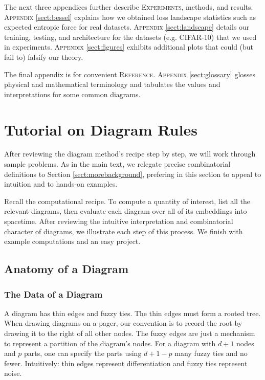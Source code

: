 \documentclass{article}
\theoremstyle{plain}
\theoremstyle{definition}
\begin{document}
    The next three appendices further describe \textsc{Experiments}, methods,
    and results.
    \textsc{Appendix} \ref{sect:bessel} explains how we obtained loss landscape
        statistics such as expected entropic force for real datasets.
    \textsc{Appendix} \ref{sect:landscape} details our training, testing, and
        architecture for the datasets (e.g. CIFAR-10) that we used in
        experiments.
    \textsc{Appendix} \ref{sect:figures} exhibits additional plots that could
        (but fail to) falsify our theory.

    The final appendix is for convenient \textsc{Reference}.
    \textsc{Appendix} \ref{sect:glossary} glosses physical and mathematical
        terminology and tabulates the values and interpretations for some
        common diagrams.

\section{Tutorial on Diagram Rules} \label{sect:tutorial}

    After reviewing the diagram method's recipe step by step, we will work
    through sample problems.  As in the main text, we
    relegate precise combinatorial definitions to Section
    \ref{sect:morebackground}, prefering in this section to appeal to intuition
    and to hands-on examples.

    Recall the computational recipe.  To compute a quantity of interest, list
    all the relevant diagrams, then evaluate each diagram over all of its
    embeddings into spacetime.  After reviewing the intuitive interpretation
    and combinatorial character of diagrams, we illustrate each step of this
    process.  We finish with example computations and an easy project.

    \subsection{Anatomy of a Diagram}
        \subsubsection*{The Data of a Diagram}
            A diagram has thin edges and fuzzy ties.  The thin edges must form
            a rooted tree.  When drawing diagrams on a pager, our convention is
            to record the root by drawing it to the right of all other nodes.
            The fuzzy edges are just a mechanism to represent a partition of
            the diagram's nodes.  For a diagram with $d+1$ nodes and $p$ parts,
            one can specify the parts using $d+1-p$ many fuzzy ties and no
            fewer.  Intuitively: thin edges represent differentiation and fuzzy
            ties represent noise.
\end{document}
